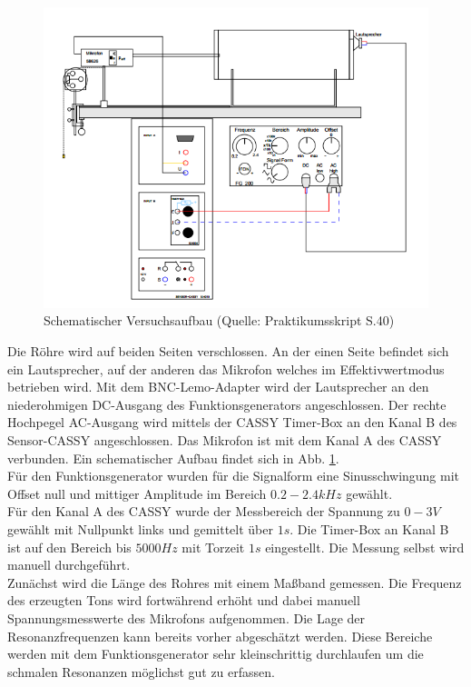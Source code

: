 \documentclass[12pt,a4paper]{article}
\begin{document}
\begin{figure}
	\includegraphics[width=\linewidth]{aufbau}
	\caption[Aufbau]{Schematischer Versuchsaufbau (Quelle: Praktikumsskript S.40)}
	\label{fig:aufbseite40}
\end{figure}
	


Die Röhre wird auf beiden Seiten verschlossen. An der einen Seite befindet sich ein Lautsprecher, auf der anderen das Mikrofon welches im Effektivwertmodus betrieben wird.
Mit dem BNC-Lemo-Adapter wird der Lautsprecher an den niederohmigen DC-Ausgang des Funktionsgenerators angeschlossen. Der rechte Hochpegel AC-Ausgang wird mittels der CASSY Timer-Box an den Kanal B des Sensor-CASSY angeschlossen. Das Mikrofon ist mit dem Kanal A des CASSY verbunden. Ein schematischer Aufbau findet sich in Abb.  \ref{fig:aufbseite40}.\\
Für den Funktionsgenerator wurden für die Signalform eine Sinusschwingung mit Offset null und mittiger Amplitude im Bereich $0.2-2.4 kHz$ gewählt.\\

Für den Kanal A des CASSY wurde der Messbereich der Spannung zu $0-3V$ gewählt mit Nullpunkt links und gemittelt über $1s$.
Die Timer-Box an Kanal B ist auf den Bereich bis $5000Hz$ mit Torzeit $1s$ eingestellt. Die Messung selbst wird manuell durchgeführt.\\

Zunächst wird die Länge des Rohres mit einem Maßband gemessen.
Die Frequenz des erzeugten Tons wird fortwährend erhöht und dabei manuell Spannungsmesswerte des Mikrofons aufgenommen. Die Lage der Resonanzfrequenzen kann bereits vorher abgeschätzt werden. Diese Bereiche werden mit dem Funktionsgenerator sehr kleinschrittig durchlaufen um die schmalen Resonanzen möglichst gut zu erfassen.
\end{document}
